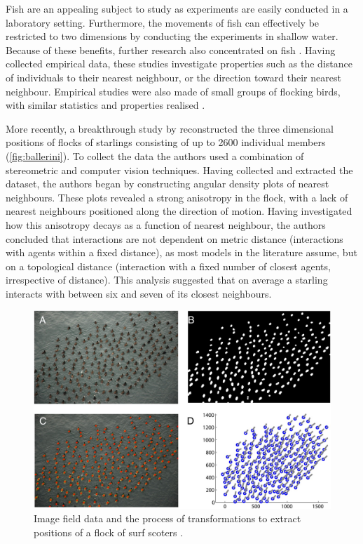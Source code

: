 Fish are an appealing subject to study as experiments are easily conducted in a laboratory setting. Furthermore, the movements of fish can effectively be restricted to two dimensions by conducting the experiments in shallow water. Because of these benefits, further research also concentrated on fish \parencite{partridge80, van_long85}. Having collected empirical data, these studies investigate properties such as the distance of individuals to their nearest neighbour, or the direction toward their nearest neighbour. Empirical studies were also made of small groups of flocking birds, with similar statistics and properties realised \parencite{major78, budgey98}.

More recently, a breakthrough study by \textcite{ballerini08} reconstructed the three dimensional positions of flocks of starlings consisting of up to 2600 individual members (\cref{fig:ballerini}). To collect the data the authors used a combination of stereometric and computer vision techniques. Having collected and extracted the dataset, the authors began by constructing angular density plots of nearest neighbours. These plots revealed a strong anisotropy in the flock, with a lack of nearest neighbours positioned along the direction of motion. Having investigated how this anisotropy decays as a function of nearest neighbour, the authors concluded that interactions are not dependent on metric distance (interactions with agents within a fixed distance), as most models in the literature assume, but on a topological distance (interaction with a fixed number of closest agents, irrespective of distance). This analysis suggested that on average a starling interacts with between six and seven of its closest neighbours.

\begin{figure}[t]
	\includegraphics[width=\textwidth]{lukeman_data.jpg}
	\caption{Image field data and the process of transformations to extract positions of a flock of surf scoters \parencite{lukeman10}.}
	\label{fig:lukeman_extraction}
\end{figure}


